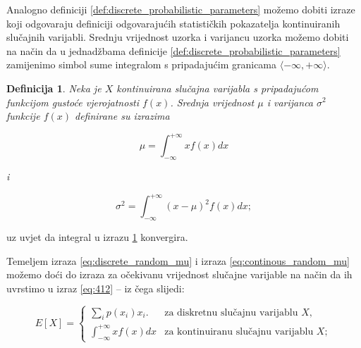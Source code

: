 \documentclass[a4paper,12pt,oneside]{memoir}
\newtheorem{definition}{Definicija}[chapter]
\begin{document}
                Analogno definiciji \ref{def:discrete_probabilistic_parameters} možemo dobiti izraze koji odgovaraju definiciji odgovarajućih statističkih pokazatelja kontinuiranih slučajnih varijabli. Srednju vrijednost uzorka i varijancu uzorka možemo dobiti na način da u jednadžbama definicije \ref{def:discrete_probabilistic_parameters} zamijenimo simbol sume integralom s pripadajućim granicama $\langle-\infty,+\infty\rangle$.

                \begin{definition}
                    Neka je $X$ kontinuirana slučajna varijabla s pripadajućom funkcijom gustoće vjerojatnosti $f(x)$. Srednja vrijednost $\mu$ i varijanca $\sigma^2$ funkcije $f(x)$ definirane su izrazima

                    \begin{equation}
                        \mu=\displaystyle\int_{-\infty}^{+\infty}xf(x)dx
                        \label{eq:continous_random_mu}
                    \end{equation}

                    i

                    \begin{equation}
                        \sigma^2=\displaystyle\int_{-\infty}^{+\infty}(x-\mu)^2f(x)dx;
                        \label{eq:continous_random_sigma}
                    \end{equation}
                    \label{def:continous_probabilistic_parameters}
                \end{definition}

                uz uvjet da integral u izrazu \ref{def:continous_probabilistic_parameters} konvergira.

                Temeljem izraza \ref{eq:discrete_random_mu} i izraza \ref{eq:continous_random_mu} možemo doći do izraza za očekivanu vrijednost slučajne varijable na način da ih uvrstimo u izraz \ref{eq:412} -- iz čega slijedi:

                \begin{equation}
                    E\left[X\right]=
                    \begin{cases}
                        \displaystyle\sum_{i}^{}p(x_i)x_i. & \text{za diskretnu slučajnu varijablu } X,\\
                        \displaystyle\int_{-\infty}^{+\infty}xf(x)dx & \text{za kontinuiranu slučajnu varijablu } X;
                    \end{cases}
                    \label{eq:joint_expectation}      
                \end{equation}
\end{document}

